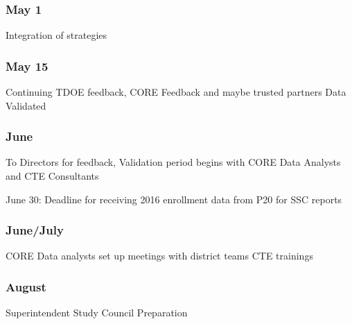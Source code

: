\documentclass[11pt,]{article}
\begin{document}
\subsubsection{May 1}\label{may-1}

Integration of strategies

\subsubsection{May 15}\label{may-15}

Continuing TDOE feedback, CORE Feedback and maybe trusted partners Data
Validated

\subsubsection{June}\label{june}

To Directors for feedback, Validation period begins with CORE Data
Analysts and CTE Consultants

June 30: Deadline for receiving 2016 enrollment data from P20 for SSC
reports

\subsubsection{June/July}\label{junejuly}

CORE Data analysts set up meetings with district teams CTE trainings

\subsubsection{August}\label{august}

Superintendent Study Council Preparation
\end{document}

